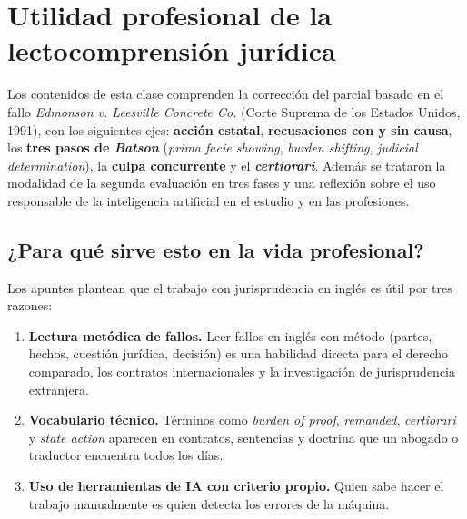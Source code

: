 \documentclass[12pt,oneside]{book}
\begin{document}
\tableofcontents


\chapter[Utilidad profesional]{Utilidad profesional de la lectocomprensión jurídica}

Los contenidos de esta clase comprenden la corrección del parcial basado en el fallo \textit{Edmonson v. Leesville Concrete Co.} (Corte Suprema de los Estados Unidos, 1991), con los siguientes ejes: \textbf{acción estatal}, \textbf{recusaciones con y sin causa}, los \textbf{tres pasos de \textit{Batson}} (\textit{prima facie showing}, \textit{burden shifting}, \textit{judicial determination}), la \textbf{culpa concurrente} y el \textbf{\textit{certiorari}}. Además se trataron la modalidad de la segunda evaluación en tres fases y una reflexión sobre el uso responsable de la inteligencia artificial en el estudio y en las profesiones.

\section{¿Para qué sirve esto en la vida profesional?}

Los apuntes plantean que el trabajo con jurisprudencia en inglés es útil por tres razones:

\begin{enumerate}
    \item \textbf{Lectura metódica de fallos.} Leer fallos en inglés con método (partes, hechos, cuestión jurídica, decisión) es una habilidad directa para el derecho comparado, los contratos internacionales y la investigación de jurisprudencia extranjera.
    \item \textbf{Vocabulario técnico.} Términos como \textit{burden of proof}, \textit{remanded}, \textit{certiorari} y \textit{state action} aparecen en contratos, sentencias y doctrina que un abogado o traductor encuentra todos los días.
    \item \textbf{Uso de herramientas de IA con criterio propio.} Quien sabe hacer el trabajo manualmente es quien detecta los errores de la máquina.
\end{enumerate}
\end{document}
